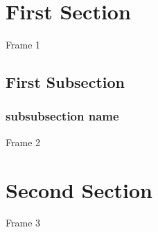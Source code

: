 \documentclass{beamer}
\begin{document}
\begin{frame}
\tableofcontents
\end{frame}

\section{First Section}

\begin{frame}
Frame 1
\end{frame}

\subsection{First Subsection}

\subsubsection{subsubsection name}

\begin{frame}
Frame 2
\end{frame}

\section{Second Section}

\begin{frame}
Frame 3
\end{frame}
\end{document}
